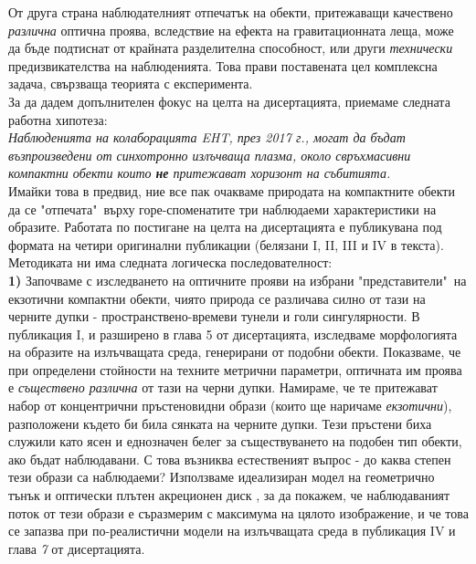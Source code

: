 \noindent От друга страна наблюдателният отпечатък на обекти, притежаващи качествено \emph{различна} оптична проява, вследствие на ефекта на гравитационната леща, може да бъде подтиснат от крайната разделителна способност, или други \emph{технически} предизвикателства на наблюденията. Това прави поставената цел комплексна задача, свързваща теорията с експеримента.\\

\noindent За да дадем допълнителен фокус на целта на дисертацията, приемаме следната работна хипотеза:\\

\emph{Наблюденията на колаборацията EHT, през 2017 г., могат да бъдат възпроизведени от синхотронно излъчваща плазма, около свръхмасивни компактни обекти които \textbf{не} притежават хоризонт на събитията.}\\

\noindent Имайки това в предвид, ние все пак очакваме природата на компактните обекти да се "отпечата"$\,$ върху горе-споменатите три наблюдаеми характеристики на образите. Работата по постигане на целта на дисертацията е публикувана под формата на четири оригинални публикации (белязани I, II, III и IV в текста). Методиката ни има следната логическа последователност:\\

\textbf{1)} Започваме с изследването на оптичните прояви на избрани "представители"$\,$ на екзотични компактни обекти, чиято природа се различава силно от тази на черните дупки - пространствено-времеви тунели и голи сингулярности. В публикация I, и разширено в глава 5 от дисертацията, изследваме морфологията на образите на излъчващата среда, генерирани от подобни обекти. Показваме, че при определени стойности на техните метрични параметри, оптичната им проява е \emph{съществено различна} от тази на черни дупки. Намираме, че те притежават набор от концентрични пръстеновидни образи (които ще наричаме \emph{екзотични}), разположени където би била сянката на черните дупки. Тези пръстени биха служили като ясен и еднозначен белег за съществуването на подобен тип обекти, ако бъдат наблюдавани. С това възниква естественият въпрос - до каква степен тези образи са наблюдаеми? Използваме идеализиран модел на геометрично тънък и оптически плътен акреционен диск \cite{Page1973}, за да покажем, че наблюдаваният поток от тези образи е съразмерим с максимума на цялото изображение, и че това се запазва при по-реалистични модели на излъчващата среда в публикация IV и глава \emph{7} от дисертацията.\\

